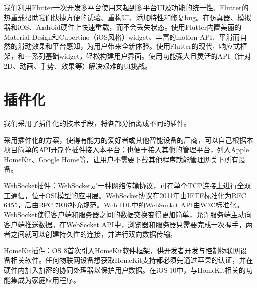 我们利用Flutter一次开发多平台使用来起到多平台UI及功能的统一性。Flutter的热重载帮助我们快捷方便的试验、重构UI、添加特性和修复bug。在仿真器、模拟器和iOS、Android硬件上快速重载，而不会丢失状态。使用Flutter内置美丽的Material Design和Cupertino（iOS风格）widget、丰富的motion API、平滑而自然的滑动效果和平台感知，为用户带来全新体验。使用Flutter的现代、响应式框架，和一系列基础widget，轻松构建用户界面。使用功能强大且灵活的API（针对2D、动画、手势、效果等）解决艰难的UI挑战。\cite{quickdev}

\section{插件化}
我们采用了插件化的技术手段，将各部分抽离成不同的插件。

采用插件化的方案，使得有能力的爱好者或其他智能设备的厂商，可以自己根据本项目简单的API开制作插件接入本平台；也便于接入其他的管理平台，列入Apple HomeKit、Google Home等，让用户不需要下载其他程序就能管理网关下所有设备。

WebSocket插件：WebSocket是一种网络传输协议，可在单个TCP连接上进行全双工通信，位于OSI模型的应用层。WebSocket协议在2011年由IETF标准化为RFC 6455，后由RFC 7936补充规范。Web IDL中的WebSocket API由W3C标准化。
WebSocket使得客户端和服务器之间的数据交换变得更加简单，允许服务端主动向客户端推送数据。在WebSocket API中，浏览器和服务器只需要完成一次握手，两者之间就可以创建持久性的连接，并进行双向数据传输。\cite{websocket}

HomeKit插件：OS 8首次引入HomeKit软件框架，供开发者开发与控制物联网设备相关软件。任何物联网设备想获取HomeKit支持都必须先通过苹果的认证，并在硬件内加入加密的协同处理器以保护用户数据。在iOS 10中，与HomeKit相关的功能集成为家庭应用程序。\cite{homekitios8}